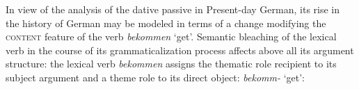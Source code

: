 \documentclass[output=paper
	        ,collection
	        ,collectionchapter
 	        ,biblatex
                ,babelshorthands
                ,newtxmath
                ,draftmode
                ,colorlinks, citecolor=brown
]{./langsci/langscibook}
\begin{document}
In view of the analysis of the dative passive in Present-day German, its rise in the history of German may be modeled in terms of a change modifying the \textsc{content} feature of the verb \textit{bekommen} `get'. Semantic bleaching of the lexical verb in the course of its grammaticalization process affects above all its argument structure: the lexical verb \textit{bekommen} assigns the thematic role recipient to its subject argument and a theme role to its direct object: 
\ea \label{active_voll} 
\textit{bekomm-} `get': \\
\z 
\end{document}
